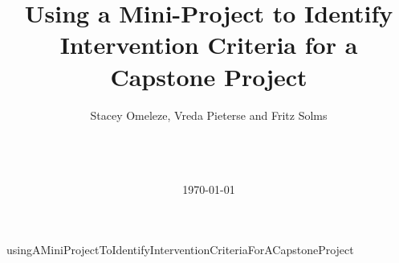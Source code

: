 \documentclass[A4]{acm_proc_article-sp}
\title{Using a Mini-Project to Identify Intervention Criteria for a Capstone Project}
\author{
\alignauthor
Stacey Omeleze, Vreda Pieterse and Fritz Solms\\
       \affaddr{Dept. of Computer Science}\\
       \affaddr{University of Pretoria}\\
       \affaddr{South Africa}\\
       \email{vpieterse@cs.up.ac.za}
}
\date{\today}
\begin{document}
  \maketitle
  

{usingAMiniProjectToIdentifyInterventionCriteriaForACapstoneProject}



\end{document}
